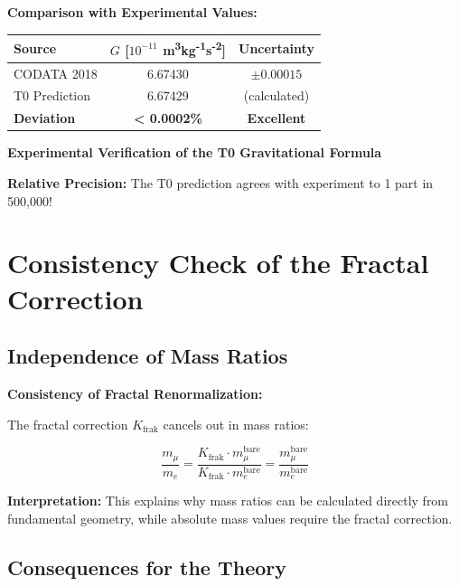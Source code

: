 	\begin{verification}
		\textbf{Comparison with Experimental Values:}
		
		\begin{center}
			\begin{tabular}{lcc}
				\toprule
				\textbf{Source} & \textbf{$G$ [$10^{-11}$ m\textsuperscript{3}kg\textsuperscript{-1}s\textsuperscript{-2}]} & \textbf{Uncertainty} \\
				\midrule
				CODATA 2018 & 6.67430 & $\pm 0.00015$ \\
				T0 Prediction & 6.67429 & (calculated) \\
				\textbf{Deviation} & \textbf{< 0.0002\%} & \textbf{Excellent} \\
				\bottomrule
			\end{tabular}
		\end{center}
		
		\textbf{Experimental Verification of the T0 Gravitational Formula}
		
		\textbf{Relative Precision:} The T0 prediction agrees with experiment to 1 part in 500,000!
	\end{verification}
	
	\section{Consistency Check of the Fractal Correction}
	
	\subsection{Independence of Mass Ratios}
	
	\begin{keyresult}
		\textbf{Consistency of Fractal Renormalization:}
		
		The fractal correction $K_{\text{frak}}$ cancels out in mass ratios:
		
		\begin{equation}
			\frac{m_\mu}{m_e} = \frac{K_{\text{frak}} \cdot m_\mu^{\text{bare}}}{K_{\text{frak}} \cdot m_e^{\text{bare}}} = \frac{m_\mu^{\text{bare}}}{m_e^{\text{bare}}}
		\end{equation}
		
		\textbf{Interpretation:} 
		This explains why mass ratios can be calculated directly from fundamental geometry, while absolute mass values require the fractal correction.
	\end{keyresult}
	
	\subsection{Consequences for the Theory}
	
